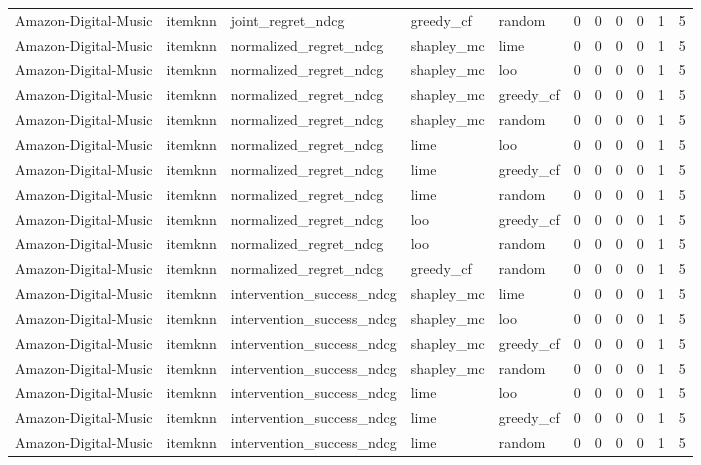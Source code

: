 \begin{table}[t]
{\begin{tabular}{lllllrrrrrr}
Amazon-Digital-Music & itemknn & joint\_regret\_ndcg & greedy\_cf & random & 0 & 0 & 0 & 0 & 1 & 5 \\
Amazon-Digital-Music & itemknn & normalized\_regret\_ndcg & shapley\_mc & lime & 0 & 0 & 0 & 0 & 1 & 5 \\
Amazon-Digital-Music & itemknn & normalized\_regret\_ndcg & shapley\_mc & loo & 0 & 0 & 0 & 0 & 1 & 5 \\
Amazon-Digital-Music & itemknn & normalized\_regret\_ndcg & shapley\_mc & greedy\_cf & 0 & 0 & 0 & 0 & 1 & 5 \\
Amazon-Digital-Music & itemknn & normalized\_regret\_ndcg & shapley\_mc & random & 0 & 0 & 0 & 0 & 1 & 5 \\
Amazon-Digital-Music & itemknn & normalized\_regret\_ndcg & lime & loo & 0 & 0 & 0 & 0 & 1 & 5 \\
Amazon-Digital-Music & itemknn & normalized\_regret\_ndcg & lime & greedy\_cf & 0 & 0 & 0 & 0 & 1 & 5 \\
Amazon-Digital-Music & itemknn & normalized\_regret\_ndcg & lime & random & 0 & 0 & 0 & 0 & 1 & 5 \\
Amazon-Digital-Music & itemknn & normalized\_regret\_ndcg & loo & greedy\_cf & 0 & 0 & 0 & 0 & 1 & 5 \\
Amazon-Digital-Music & itemknn & normalized\_regret\_ndcg & loo & random & 0 & 0 & 0 & 0 & 1 & 5 \\
Amazon-Digital-Music & itemknn & normalized\_regret\_ndcg & greedy\_cf & random & 0 & 0 & 0 & 0 & 1 & 5 \\
Amazon-Digital-Music & itemknn & intervention\_success\_ndcg & shapley\_mc & lime & 0 & 0 & 0 & 0 & 1 & 5 \\
Amazon-Digital-Music & itemknn & intervention\_success\_ndcg & shapley\_mc & loo & 0 & 0 & 0 & 0 & 1 & 5 \\
Amazon-Digital-Music & itemknn & intervention\_success\_ndcg & shapley\_mc & greedy\_cf & 0 & 0 & 0 & 0 & 1 & 5 \\
Amazon-Digital-Music & itemknn & intervention\_success\_ndcg & shapley\_mc & random & 0 & 0 & 0 & 0 & 1 & 5 \\
Amazon-Digital-Music & itemknn & intervention\_success\_ndcg & lime & loo & 0 & 0 & 0 & 0 & 1 & 5 \\
Amazon-Digital-Music & itemknn & intervention\_success\_ndcg & lime & greedy\_cf & 0 & 0 & 0 & 0 & 1 & 5 \\
Amazon-Digital-Music & itemknn & intervention\_success\_ndcg & lime & random & 0 & 0 & 0 & 0 & 1 & 5 \\

\end{tabular}}
\end{table}
